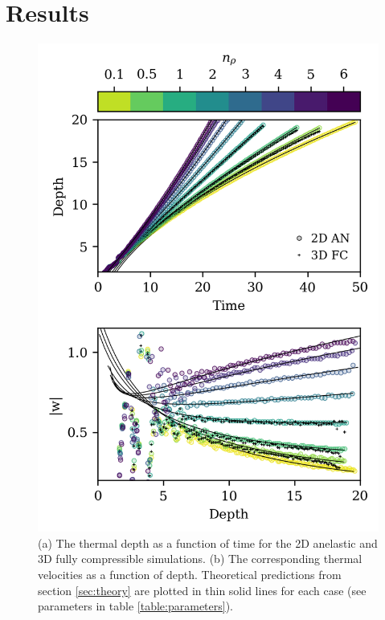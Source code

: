 \documentclass[twocolumn, amsmath, amsfonts, amssymb, trackchanges]{aastex62}
\begin{document}
\section{Results}
\label{sec:results}
\begin{figure}[t!]
    \includegraphics[width=\columnwidth]{results_panels.png}
    \caption{
	(a) The thermal depth as a function of time for the 2D anelastic and 3D fully compressible simulations.
	(b) The corresponding thermal velocities as a function of depth.
	Theoretical predictions from section \ref{sec:theory} are plotted in thin solid lines for each case (see parameters in table \ref{table:parameters}).
    \label{fig:results_panels} }
\end{figure}
\end{document}
